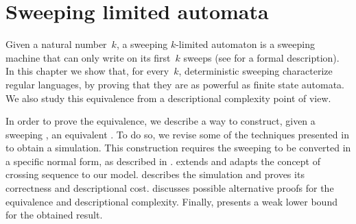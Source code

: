 \chapter{Sweeping limited automata}\label{ch:sweeping}
Given a natural number~$k$, a sweeping $k$-limited automaton is a sweeping machine that can only write on its first~$k$ sweeps (see  for a formal description).
In this chapter we show that, for every~$k$, deterministic sweeping \kLAs characterize regular languages, by proving that they are as powerful as finite state automata. We also study this equivalence from a descriptional complexity point of view.

In order to prove the equivalence, we describe a way to construct, given a sweeping \kDLA, an equivalent \ONFA.
To do so, we revise some of the techniques presented in  to obtain a simulation.
This construction requires the sweeping \kDLA to be converted in a specific normal form, as described in .
 extends and adapts the concept of crossing sequence to our model.
 describes the simulation and proves its correctness and descriptional cost.
 discusses possible alternative proofs for the equivalence and descriptional complexity.
Finally,  presents a weak lower bound for the obtained result.



